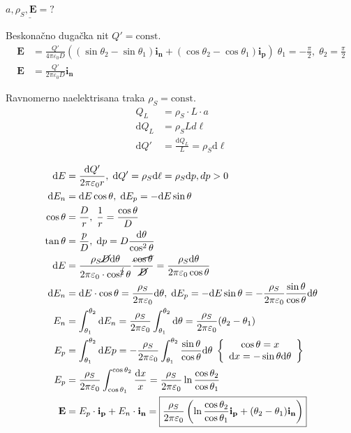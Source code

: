 $\underline{a,\rho_S, \mathbf{E} = ?}$

Beskona\v{c}no duga\v{c}ka nit $Q' = \mathrm{const}.$
\begin{align*}
    \mathbf{E} &= \frac{Q'}{4\pi\varepsilon_0 D}\left((\sin\theta_2 - \sin\theta_1)\mathbf{i_n} + (\cos\theta_2 - \cos\theta_1)\mathbf{i_p}\right)\; \theta_1 = -\frac{\pi}{2},\; \theta_2 = \frac{\pi}{2}\\
    \mathbf E &= \boxed{\frac{Q'}{2\pi\varepsilon_0 D}\mathbf{i_n}}
\end{align*}

Ravnomerno naelektrisana traka $\rho_S = \mathrm{const}.$
\begin{align*}
    Q_L &= \rho_S\cdot L\cdot a\\
    \mathrm dQ_L &= \rho_SLd\ell\\
    \mathrm dQ' &= \frac{\mathrm dQ_L}{L} = \rho_S\mathrm d\ell
\end{align*}

\begin{align*}
    \mathrm dE &= \frac{\mathrm dQ'}{2\pi\varepsilon_0 r},\; \mathrm dQ' = \rho_S\mathrm d\ell = \rho_S\mathrm dp, dp > 0\\
    \mathrm dE_n &= \mathrm dE\cos\theta,\;\mathrm dE_p = -\mathrm dE\sin\theta\\
    \cos\theta &= \frac{D}{r},\;\frac{1}{r}=\frac{\cos\theta}{D}\\
    \tan\theta &= \frac{p}{D},\; \mathrm dp = D\frac{\mathrm d\theta}{\cos^2\theta}\\
    \mathrm dE &= \frac{\rho_S \cancel{D}\mathrm d\theta}{ 2\pi\varepsilon_0\cdot \cos^{\cancel{2}}\theta} \frac{\cancel{\cos\theta}}{\cancel{D}} = \frac{\rho_S\mathrm d\theta}{2\pi\varepsilon_0\cos\theta}\\
    \mathrm dE_n &= \mathrm dE\cdot\cos\theta = \frac{\rho_S}{2\pi\varepsilon_0}\mathrm d\theta,\; \mathrm dE_p = -\mathrm dE\sin\theta = -\frac{\rho_S}{2\pi\varepsilon_0}\frac{\sin\theta}{\cos\theta}\mathrm d\theta\\
    E_n &= \int_{\theta_1}^{\theta_2}\mathrm dE_n = \frac{\rho_S}{2\pi\varepsilon_0}\int_{\theta_1}^{\theta_2}\mathrm d\theta = \frac{\rho_S}{2\pi\varepsilon_0}(\theta_2 - \theta_1)\\
    E_p &= \int_{\theta_1}^{\theta_2}\mathrm dEp = - \frac{\rho_S}{2\pi\varepsilon_0}\int_{\theta_1}^{\theta_2}\frac{\sin\theta}{\cos\theta}\mathrm d\theta\; \left\{\begin{array}{c}\cos\theta = x\\ \mathrm dx = -\sin\theta\mathrm d\theta\end{array} \right\}\\
    E_p &= \frac{\rho_S}{2\pi\varepsilon_0}\int_{\cos\theta_1}^{\cos\theta_2}\frac{\mathrm dx}{x} = \frac{\rho_S}{2\pi\varepsilon_0}\ln\frac{\cos\theta_2}{\cos\theta_1}\\
    \mathbf E &= E_p\cdot \mathbf{i_p} + E_n\cdot\mathbf{i_n} = \boxed{\frac{\rho_S}{2\pi\varepsilon_0}\left(\ln\frac{\cos\theta_2}{\cos\theta_1}\mathbf{i_p} + (\theta_2 - \theta_1)\mathbf{i_n}\right)}
\end{align*}